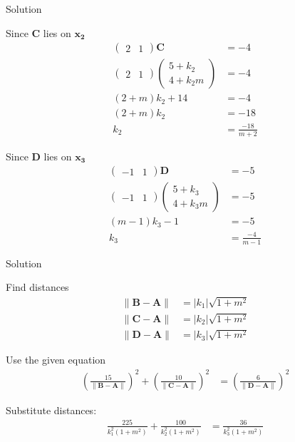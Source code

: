 \documentclass{beamer}
\numberwithin{equation}{section}
\theoremstyle{remark}
\providecommand{\norm}[1]{\lVert#1\rVert}
\newcommand{\myvec}[1]{\ensuremath{\begin{pmatrix}#1\end{pmatrix}}}
\let\vec\mathbf
\begin{document}
\begin{frame}{Solution}

Since $\vec{C}$ lies on $\vec{x_2}$
\begin{align}
\myvec{2 & 1}\vec{C} &= -4 \\
\myvec{2 & 1}\myvec{5+k_2\\4+k_2m} &= -4\\
(2+m)k_2+14 &= -4 \\
(2+m)k_2 &= -18 \\
k_2 &= \frac{-18}{m+2}
\end{align}

Since $\vec{D}$ lies on $\vec{x_3}$
\begin{align}
\myvec{-1 & 1}\vec{D} &= -5\\
\myvec{-1 & 1}\myvec{5+k_3\\4+k_3m} &= -5\\
(m-1)k_3-1 &= -5 \\
k_3 &= \frac{-4}{m-1}
\end{align}

\end{frame}

\begin{frame}{Solution}

Find distances
\begin{align}
  \norm{\vec{B}-\vec{A}} &= |k_1|\sqrt{1+m^2} \\
\norm{\vec{C}-\vec{A}} &= |k_2|\sqrt{1+m^2} \\
\norm{\vec{D}-\vec{A}} &= |k_3|\sqrt{1+m^2}
\end{align}

Use the given equation
\begin{align}
\left(\frac{15}{\norm{\vec{B}-\vec{A}}}\right)^2 
+ \left(\frac{10}{\norm{\vec{C}-\vec{A}}}\right)^2 
&= \left(\frac{6}{\norm{\vec{D}-\vec{A}}}\right)^2
\end{align}

Substitute distances:
\begin{align}
\frac{225}{k_1^2(1+m^2)} + \frac{100}{k_2^2(1+m^2)} 
&= \frac{36}{k_3^2(1+m^2)}
\end{align}

\end{frame}
\end{document}
